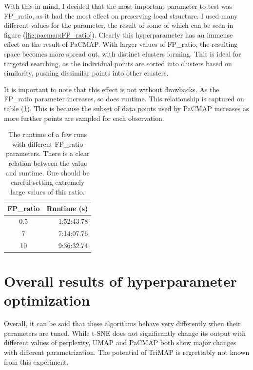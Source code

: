 With this in mind, I decided that the most important parameter to test was FP\_ratio, as it had the most effect on preserving local structure. I used many different values for the parameter, the result of some of which can be seen in figure (\ref{fig:pacmap:FP_ratio}). Clearly this hyperparameter has an immense effect on the result of PaCMAP. With larger values of FP\_ratio, the resulting space becomes more spread out, with distinct clusters forming. This is ideal for targeted searching, as the individual points are sorted into clusters based on similarity, pushing dissimilar points into other clusters.

It is important to note that this effect is not without drawbacks. As the FP\_ratio parameter increases, so does runtime. This relationship is captured on table (\ref{tab:pacmap:runtime}). This is because the subset of data points used by PaCMAP increases as more further points are sampled for each observation.

\begin{table}
	\begin{center}
		\begin{tabular}{|c|r|}
			\hline
			FP\_ratio & Runtime (s)\\
			\hline
			0.5 & 1:52:43.78 \\
			\hline
			7 & 7:14:07.76 \\
			\hline
			10 & 9:36:32.74 \\
			\hline
		\end{tabular}
	\end{center}
	\caption{The runtime of a few runs with different FP\_ratio parameters. There is a clear relation between the value and runtime. One should be careful setting extremely large values of this ratio.}
	\label{tab:pacmap:runtime}
\end{table}

\section{Overall results of hyperparameter optimization}\label{sec:overall-results-of-hyperparameter-optimization}

Overall, it can be said that these algorithms behave very differently when their parameters are tuned. While t-SNE does not significantly change its output with different values of perplexity, UMAP and PaCMAP both show major changes with different parametrization. The potential of TriMAP is regrettably not known from this experiment.

